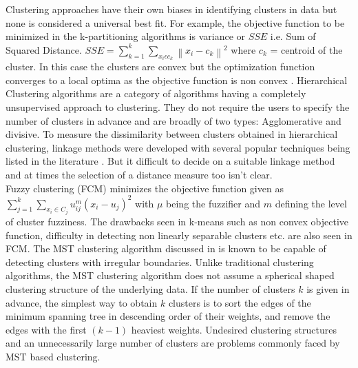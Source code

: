 Clustering approaches have their own biases in identifying
clusters in data but none is considered a universal
best fit. For example, the objective function to be minimized
in the k-partitioning algorithms is variance or $SSE$ i.e. Sum of Squared Distance. $  SSE = \sum_{k=1}^{k} \sum_{x_i \epsilon c_k} \left \| x_i - c_k \right \| ^2 $ where $c_k$ = centroid of the cluster. In this case the clusters are convex
but the optimization function converges to a local optima as the objective
function is non convex \cite{aps:2}. Hierarchical
Clustering algorithms are a category of algorithms
having a completely unsupervised approach to clustering.
They do not require the users to specify the number of clusters
in advance and are broadly of two types: Agglomerative
and divisive. To measure the dissimilarity between clusters
obtained in hierarchical clustering, linkage methods were
developed with several popular techniques being listed in the
literature \cite{aps:2} \cite{aps:8} \cite{aps:4}. But it difficult to decide on a suitable linkage method and at times the selection of a distance measure too isn't clear.\\

Fuzzy clustering (FCM) minimizes the objective function given as
$\sum_{j=1}^{k}\sum_{x_i \in C_j} u_{ij}^m (x_i - u_j)^2 $
 with $\mu$ being the fuzzifier and
$m$ defining the level of cluster fuzziness. The drawbacks seen in k-means such as non convex objective function, difficulty in detecting non linearly separable clusters etc. are also seen in FCM. The MST clustering
algorithm discussed in \cite{aps:54} is known to be capable of
detecting clusters with irregular boundaries. Unlike traditional
clustering algorithms, the MST clustering algorithm does
not assume a spherical shaped clustering structure of the
underlying data. If the
number of clusters $k$ is given in advance, the simplest way to
obtain $k$ clusters is to sort the edges of the minimum spanning
tree in descending order of their weights, and remove the
edges with the first $(k-1)$ heaviest weights. Undesired clustering
structures and an unnecessarily large number of clusters are
problems commonly faced by MST based clustering. \\


